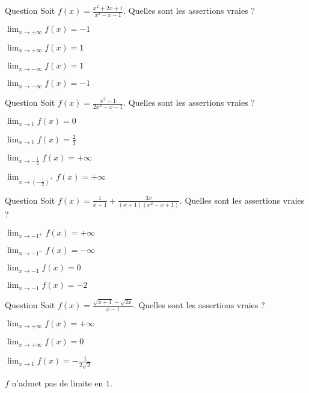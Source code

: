 

\begin{multi}[multiple,feedback=
{La limite en l'infini d'une fraction rationnelle est la limite de la fraction des monômes de plus haut degré.
}]{Question}
Soit \(f(x)= \frac{x^2+2x+1}{x^2-x-1}\). Quelles sont les assertions vraies ?

    \item \(\lim_{x\to +\infty} f(x)=-1\)
    \item* \(\lim_{x\to +\infty} f(x)=1\)
    \item* \(\lim_{x\to -\infty} f(x)=1\)
    \item \(\lim_{x\to -\infty} f(x)=-1\)
\end{multi}


\begin{multi}[multiple,feedback=
{\(f(x)=\frac{(x-1)(x+1)}{(x-1)(2x+1)}= \frac{x+1}{2x+1}\).
}]{Question}
Soit \(f(x)= \frac{x^2-1}{2x^2-x-1}\). Quelles sont les assertions vraies ?

    \item \(\lim_{x\to 1} f(x)=0\)
    \item* \(\lim_{x\to 1} f(x)=\frac{2}{3}\)
    \item \(\lim_{x\to -\frac{1}{2}} f(x) = +\infty\)
    \item* \(\lim_{x\to (-\frac{1}{2})^+} f(x)=+\infty\)
\end{multi}


\begin{multi}[multiple,feedback=
{En réduisant au même dénominateur, on obtient :  \(f(x)= \frac{x+1}{x^2-x+1}\). 
}]{Question}
Soit \(f(x)= \frac{1}{x+1}+ \frac{3x}{(x+1)(x^2-x+1)}\). Quelles sont les assertions vraies ?

    \item \(\lim_{x\to -1^+} f(x)=+\infty\)
    \item \(\lim_{x\to -1^-} f(x)=-\infty\)
    \item* \(\lim_{x\to -1} f(x)=0\)
    \item \(\lim_{x\to -1} f(x)=-2\)
\end{multi}


\begin{multi}[multiple,feedback=
{On multiplie le numérateur et le dénominateur de \(f\) par l'expression conjuguée de \(\sqrt {x+1}-\sqrt {2x}\), c'est-à-dire par  \(\sqrt {x+1}+\sqrt {2x}\). On obtient : 
\(f(x)= -\frac{1}{\sqrt {x+1}+\sqrt {2x}}\).
}]{Question}
Soit \(f(x)= \frac{\sqrt {x+1}-\sqrt {2x}}{x-1}\). Quelles sont les assertions vraies ?

    \item \(\lim_{x\to +\infty} f(x)=+\infty\)
    \item* \(\lim_{x\to +\infty} f(x)=0\)
    \item* \(\lim_{x\to 1} f(x)=-\frac{1}{2\sqrt 2}\)
    \item \(f\) n'admet pas de limite en \(1\).
\end{multi}


